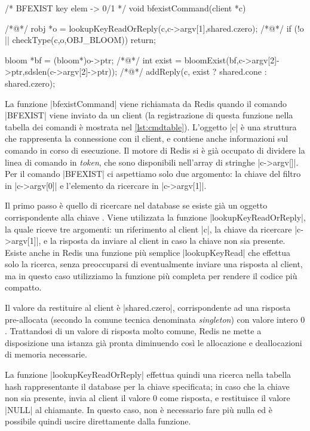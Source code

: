 \begin{commentedsource}[style=csource,caption=Implementazione comando BFEXIST,label={lst:bfexistCommand}]
/* BFEXIST key elem -> 0/1 */
void bfexistCommand(client *c) {
/*@\lnote@*/    robj *o = lookupKeyReadOrReply(c,c->argv[1],shared.czero);
/*@\lnote@*/    if (!o || checkType(c,o,OBJ_BLOOM)) {
        return;
    }

    bloom *bf = (bloom*)o->ptr;
/*@\lnote@*/    int exist = bloomExist(bf,c->argv[2]->ptr,sdslen(c->argv[2]->ptr));
/*@\lnote@*/    addReply(c, exist ? shared.cone : shared.czero);
}
\end{commentedsource}

La funzione \cverb|bfexistCommand| viene richiamata da Redis quando il comando \cverb|BFEXIST| viene
inviato da un client (la registrazione di questa funzione nella tabella dei comandi è mostrata nel
\autoref{lst:cmdtable}). L'oggetto \cverb|c| è una struttura che rappresenta la connessione con il
client, e contiene anche informazioni sul comando in corso di esecuzione. Il motore di Redis si è
già occupato di dividere la linea di comando in \emph{token}, che sono disponibili nell'array di
stringhe \cverb|c->argv[]|. Per il comando \cverb|BFEXIST| ci aspettiamo solo due argomento: la chiave
del filtro in \cverb|c->argv[0]| e l'elemento da ricercare in \cverb|c->argv[1]|.

Il primo passo è quello di ricercare nel database se esiste già un oggetto corrispondente alla
chiave . Viene utilizzata la funzione \cverb|lookupKeyReadOrReply|, la quale riceve
tre argomenti: un riferimento al client \cverb|c|, la chiave da ricercare \cverb|c->argv[1]|, e 
la risposta da inviare al client in caso la chiave non sia presente. Esiste anche in Redis una
funzione più semplice \cverb|lookupKeyRead| che effettua solo la ricerca, senza preoccuparsi
di eventualmente inviare una risposta al client, ma in questo caso utilizziamo la funzione
più completa per rendere il codice più compatto.

Il valore da restituire al client è \cverb|shared.czero|, corrispondente ad una risposta pre-allocata
(secondo la comune tecnica denominata \emph{singleton}) con valore intero $0$. Trattandosi di un
valore di risposta molto comune, Redis ne mette a disposizione una istanza già pronta diminuendo
così le allocazione e deallocazioni di memoria necessarie.

La funzione \cverb|lookupKeyReadOrReply| effettua quindi una ricerca nella tabella hash
rappresentante il database per la chiave specificata; in caso che la chiave non sia presente, invia
al client il valore $0$ come risposta, e restituisce il valore \cverb|NULL| al chiamante. In questo
caso, non è necessario fare più nulla ed è possibile quindi uscire direttamente dalla funzione.

